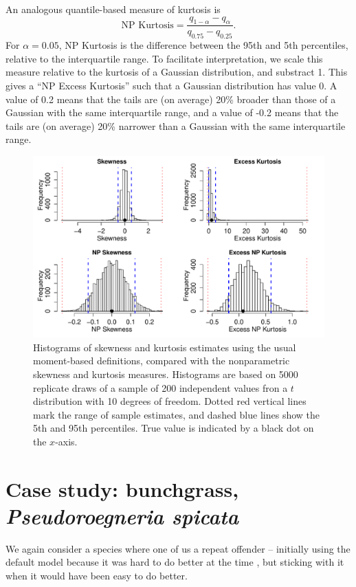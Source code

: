 \documentclass[11pt]{article}
\newcounter{box}
\newcommand{\be}{\begin{equation}}
\newcommand{\ee}{\end{equation}}
\begin{document}
{An analogous quantile-based measure of kurtosis is 
\be
\mbox{NP Kurtosis}  = \frac{q_{1-\alpha} - q_{\alpha}}{q_{0.75} - q_{0.25}}.
\ee
For $\alpha=0.05$, NP Kurtosis is the difference between the 95th and 5th percentiles, relative to the interquartile range. 
To facilitate interpretation, we scale this measure relative to the kurtosis of a Gaussian distribution, and substract 1. 
This gives a ``NP Excess Kurtosis'' such that a Gaussian distribution has value 0. A value of 0.2 means that the tails
are (on average) 20\% broader than those of a Gaussian with the same interquartile range, and a value of -0.2 means that the tails
are (on average) 20\% narrower than a Gaussian with the same interquartile range. 

\begin{figure}[tbp]
\centering
\includegraphics[width=\textwidth]{figures/NPmoments.pdf}
\caption{Histograms of skewness and kurtosis estimates using the usual moment-based definitions, compared with the nonparametric
skewness and kurtosis measures. Histograms are based on 5000 replicate draws of a sample of 200 independent values fron 
a $t$ distribution with 10 degrees of freedom. 
Dotted red vertical lines mark the range of sample estimates, and dashed blue lines show the 5th and 95th percentiles.
True value is indicated by a black dot on the $x$-axis.}
\label{fig:NPmoments}
\end{figure} 

\section{Case study: bunchgrass, \emph{Pseudoroegneria spicata}}

We again consider a species where one of us a repeat offender -- initially using the default model because 
it was hard to do better at the time \citep{adler-etal-2010}, but sticking with it 
\citep[e.g.,][]{Tredennick2018, Adler-2018} when it would have been easy to do better.   

}
\end{document}
